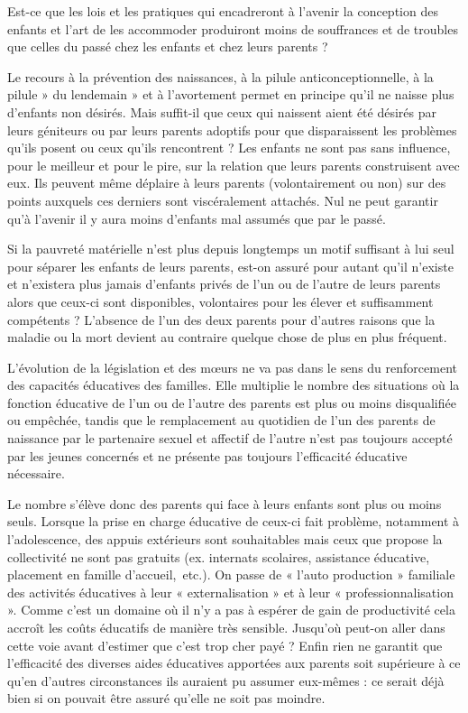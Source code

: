  Est-ce que les lois et les pratiques qui encadreront à l'avenir la conception des enfants et l'art de les accommoder produiront moins de souffrances et de troubles que celles du passé chez les enfants et chez leurs parents ?
 

 Le recours à la prévention des naissances, à la pilule anticonceptionnelle, à la pilule » du lendemain » et à l'avortement permet en principe qu'il ne naisse plus d'enfants non désirés. Mais suffit-il que ceux qui naissent aient été désirés par leurs géniteurs ou par leurs parents adoptifs pour que disparaissent les problèmes qu'ils posent ou ceux qu'ils rencontrent ? Les enfants ne sont pas sans influence, pour le meilleur et pour le pire, sur la relation que leurs parents construisent avec eux. Ils peuvent même déplaire à leurs parents (volontairement ou non) sur des points auxquels ces derniers sont viscéralement attachés. Nul ne peut garantir qu'à l'avenir il y aura moins d'enfants mal assumés que par le passé. 

 Si la pauvreté matérielle n'est plus depuis longtemps un motif suffisant à lui seul pour séparer les enfants de leurs parents, est-on assuré pour autant qu'il n'existe et n'existera plus jamais d'enfants privés de l'un ou de l'autre de leurs parents alors que ceux-ci sont disponibles, volontaires pour les élever et suffisamment compétents ? L'absence de l'un des deux parents pour d'autres raisons que la maladie ou la mort devient au contraire quelque chose de plus en plus fréquent. 

 L'évolution de la législation et des mœurs ne va pas dans le sens du renforcement des capacités éducatives des familles. Elle multiplie le nombre des situations où la fonction éducative de l'un ou de l'autre des parents est plus ou moins disqualifiée ou empêchée, tandis que le remplacement au quotidien de l'un des parents de naissance par le partenaire sexuel et affectif de l'autre n'est pas toujours accepté par les jeunes concernés et ne présente pas toujours l'efficacité éducative nécessaire. 

 Le nombre s'élève donc des parents qui face à leurs enfants sont plus ou moins seuls. Lorsque la prise en charge éducative de ceux-ci fait problème, notamment à l'adolescence, des appuis extérieurs sont souhaitables mais ceux que propose la collectivité ne sont pas gratuits (ex. internats scolaires, assistance éducative, placement en famille d'accueil,~etc.). On passe de « l'auto production » familiale des activités éducatives à leur « externalisation » et à leur « professionnalisation ». Comme c'est un domaine où il n'y a pas à espérer de gain de productivité cela accroît les coûts éducatifs de manière très sensible. Jusqu'où peut-on aller dans cette voie avant d'estimer que c'est trop cher payé ? Enfin rien ne garantit que l'efficacité des diverses aides éducatives apportées aux parents soit supérieure à ce qu'en d'autres circonstances ils auraient pu assumer eux-mêmes : ce serait déjà bien si on pouvait être assuré qu'elle ne soit pas moindre. 
 
